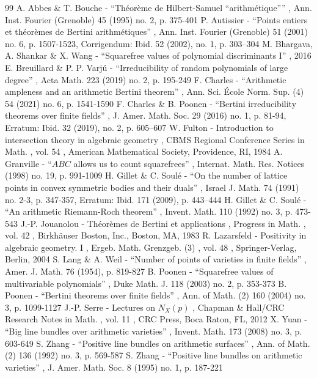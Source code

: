 \documentclass[11pt]{article}
\numberwithin{equation}{section}
\theoremstyle{plain}
\theoremstyle{definition}
\begin{document}
\begin{thebibliography}{99}
 A. Abbes \& T. Bouche - “Théorème de Hilbert-Samuel “arithmétique”” , Ann. Inst. Fourier (Grenoble) 45 (1995) no. 2, p. 375-401
 P. Autissier - “Points entiers et théorèmes de Bertini arithmétiques” , Ann. Inst. Fourier (Grenoble) 51 (2001) no. 6, p. 1507-1523, Corrigendum: Ibid. 52 (2002), no. 1, p. 303–304
 M. Bhargava, A. Shankar \& X. Wang - “Squarefree values of polynomial discriminants I” , 2016
 E. Breuillard \& P. P. Varjú - “Irreducibility of random polynomials of large degree” , Acta Math. 223 (2019) no. 2, p. 195-249
 F. Charles - “Arithmetic ampleness and an arithmetic Bertini theorem” , Ann. Sci. École Norm. Sup. (4) 54 (2021) no. 6, p. 1541-1590
 F. Charles \& B. Poonen - “Bertini irreducibility theorems over finite fields” , J. Amer. Math. Soc. 29 (2016) no. 1, p. 81-94, Erratum: Ibid. 32 (2019), no. 2, p. 605–607
 W. Fulton - Introduction to intersection theory in algebraic geometry , CBMS Regional Conference Series in Math. , vol. 54 , American Mathematical Society, Providence, RI, 1984
 A. Granville - “$ABC$ allows us to count squarefrees” , Internat. Math. Res. Notices (1998) no. 19, p. 991-1009
 H. Gillet \& C. Soulé - “On the number of lattice points in convex symmetric bodies and their duals” , Israel J. Math. 74 (1991) no. 2-3, p. 347-357, Erratum: Ibid. 171 (2009), p. 443–444
 H. Gillet \& C. Soulé - “An arithmetic Riemann-Roch theorem” , Invent. Math. 110 (1992) no. 3, p. 473-543
 J.-P. Jouanolou - Théorèmes de Bertini et applications , Progress in Math. , vol. 42 , Birkhäuser Boston, Inc., Boston, MA, 1983
 R. Lazarsfeld - Positivity in algebraic geometry. I , Ergeb. Math. Grenzgeb. (3) , vol. 48 , Springer-Verlag, Berlin, 2004
 S. Lang \& A. Weil - “Number of points of varieties in finite fields” , Amer. J. Math. 76 (1954), p. 819-827
 B. Poonen - “Squarefree values of multivariable polynomials” , Duke Math. J. 118 (2003) no. 2, p. 353-373
 B. Poonen - “Bertini theorems over finite fields” , Ann. of Math. (2) 160 (2004) no. 3, p. 1099-1127
 J.-P. Serre - Lectures on $N_X (p)$ , Chapman \& Hall/CRC Research Notes in Math. , vol. 11 , CRC Press, Boca Raton, FL, 2012
 X. Yuan - “Big line bundles over arithmetic varieties” , Invent. Math. 173 (2008) no. 3, p. 603-649
 S. Zhang - “Positive line bundles on arithmetic surfaces” , Ann. of Math. (2) 136 (1992) no. 3, p. 569-587
 S. Zhang - “Positive line bundles on arithmetic varieties” , J. Amer. Math. Soc. 8 (1995) no. 1, p. 187-221
\end{thebibliography}
\end{document}
